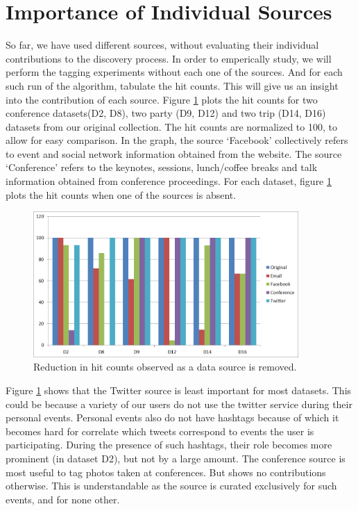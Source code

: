 \section{Importance of Individual Sources}

So far, we have used different sources, without evaluating their individual contributions to the discovery process. In order to emperically study, we will perform the tagging experiments without each one of the sources. And for each such run of the algorithm, tabulate the hit counts. This will give us an insight into the contribution of each source. Figure \ref{fig:source-benefits} plots the hit counts for two conference datasets(D2, D8), two party (D9, D12) and two trip (D14, D16) datasets from our original collection. The hit counts are normalized to 100, to allow for easy comparison. In the graph, the source `Facebook' collectively refers to event and social network information obtained from the website. The source `Conference' refers to the keynotes, sessions, lunch/coffee breaks and talk information obtained from conference proceedings. For each dataset, figure \ref{fig:source-benefits} plots the hit counts when one of the sources is absent.

\begin{figure}[t]
\centering
\includegraphics[width=0.9\textwidth]{media/chapter5/source-benefits.png}
\caption{Reduction in hit counts observed as a data source is removed.}
\label{fig:source-benefits}
\end{figure}

Figure \ref{fig:source-benefits} shows that the Twitter source is least important for most datasets. This could be because a variety of our users do not use the twitter service during their personal events. Personal events also do not have hashtags because of which it becomes hard for correlate which tweets correspond to events the user is participating. During the presence of such hashtags, their role becomes more prominent (in dataset D2), but not by a large amount. The conference source is most useful to tag photos taken at conferences. But shows no contributions otherwise. This is understandable as the source is curated exclusively for such events, and for none other. 


